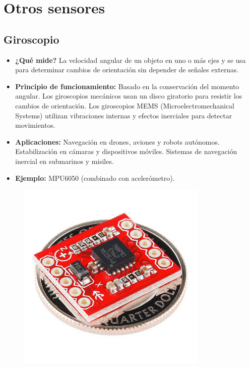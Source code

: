 \section{Otros sensores}
\subsection*{Giroscopio}
\begin{itemize}
	\item \textbf{¿Qué mide?} La velocidad angular de un objeto en uno o más ejes y se usa para determinar cambios de orientación sin depender de señales externas.
	\item \textbf{Principio de funcionamiento:} Basado en la conservación del momento angular.
	Los giroscopios mecánicos usan un disco giratorio para resistir los cambios de orientación.
	Los giroscopios MEMS (Microelectromechanical Systems) utilizan vibraciones internas y efectos inerciales para detectar movimientos.
	
	\item \textbf{Aplicaciones:} Navegación en drones, aviones y robots autónomos.
	Estabilización en cámaras y dispositivos móviles.
	Sistemas de navegación inercial en submarinos y misiles.
	\item \textbf{Ejemplo:} MPU6050 (combinado con acelerómetro).
\end{itemize}
\begin{figure}[h]
	\centering
	\includegraphics[width=0.3\linewidth]{img/giroscopio}
	\label{fig:giroscopio}
\end{figure}
